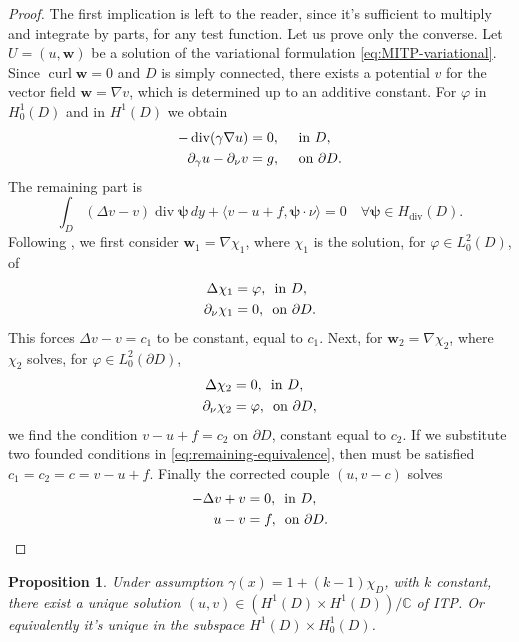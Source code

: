 \documentclass[10pt, a4paper, twoside, openright]{book}
\theoremstyle{definition}
\theoremstyle{plain}
\theoremstyle{plain}
\theoremstyle{plain}
\newtheorem{proposition}[subsection]{Proposition}
\theoremstyle{plain}
\theoremstyle{plain}
\theoremstyle{plain}
\theoremstyle{plain}
\theoremstyle{plain}
\DeclareMathOperator{\divergence}{div}
\DeclareMathOperator{\curl}{curl}
\let\phi\varphi
\begin{document}
\begin{proof}
 The first implication is left to the reader, since it's sufficient to multiply and integrate by parts, 
 for any test function. Let us prove only the converse.
 Let $U=(u, \bm w)$ be a solution of the variational formulation \eqref{eq:MITP-variational}. 
 Since $\curl \bm w=0$ and $D$ is simply connected, there exists a potential $v$ 
 for the vector field $\bm w = \nabla v$, which is determined up to an additive constant. 
 For $\phi$ in $H^1_0(D)$ and in $H^1(D)$ we obtain
 \begin{align}
  -\divergence(\gamma\nabla u)&=0,\quad\textup{ in }D, \\
  \partial_\gamma u - \partial_\nu v&= g,\quad\textup{ on }\partial D.
 \end{align}
 The remaining part is
 \begin{equation}
 \label{eq:remaining-equivalence}
  \int_D(\Delta v - v)\divergence\bm\psi\, dy + \langle v-u + f,\bm\psi\cdot\nu\rangle = 0 \quad \forall\bm\psi\in H_{\divergence}(D).
 \end{equation}
Following \cite{cakoni-colton-haddar:lsm}, we first consider $\bm w_1 = \nabla \chi_1 $, 
where $\chi_1$ is the solution, for $\phi \in L^2_0(D)$, of
\begin{align}
 \Delta \chi_1 &= \phi, \, \textup{ in }D,\\
 \partial_\nu \chi_1 &= 0,\, \textup{ on }\partial D.
\end{align}
This forces $\Delta v - v = c_1$ to be constant, equal to $c_1$. Next, for $\bm w_2 = \nabla\chi_2$, where $\chi_2$ solves, for $\phi\in L^2_0(\partial D)$,
\begin{align}
 \Delta \chi_2 &= 0, \, \textup{ in }D,\\
 \partial_\nu \chi_2 &= \phi,\, \textup{ on }\partial D,
\end{align}
we find the condition $v-u+f=c_2$ on $\partial D$, constant equal to $c_2$. 
If we substitute two founded conditions in \eqref{eq:remaining-equivalence}, then must be satisfied $c_1=c_2=c=v-u+f$. Finally the corrected couple $(u,v-c)$ solves
 \begin{align}
  - \Delta v + v&=0,\,\textup{ in } D,\\
  u-v &= f,\,\textup{ on }\partial D.
 \end{align}
\end{proof}
\begin{proposition}
\label{prop:ITP-ex-un}
 Under assumption $\gamma(x)=1+(k-1)\chi_D$, with $k$ constant, there exist a unique solution $(u,v)\in(H^1(D) \times H^1(D))/\mathbb{C}$ of ITP. Or equivalently it's unique in the subspace $H^1(D)\times H^1_0(D)$.
\end{proposition}
\end{document}
